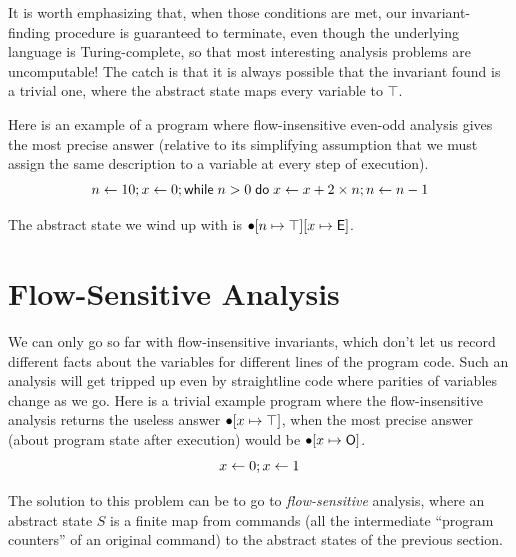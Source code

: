 \documentclass{amsbook}
\theoremstyle{definition}
\theoremstyle{remark}
\numberwithin{section}{chapter}
\numberwithin{equation}{chapter}
\begin{document}
It is worth emphasizing that, when those conditions are met, our invariant-finding procedure is guaranteed to terminate, even though the underlying language is Turing-complete, so that most interesting analysis problems are uncomputable!
The catch is that it is always possible that the invariant found is a trivial one, where the abstract state maps every variable to $\top$.

Here is an example of a program where flow-insensitive even-odd analysis gives the most precise answer (relative to its simplifying assumption that we must assign the same description to a variable at every step of execution).
$$n \leftarrow 10; x \leftarrow 0; \mathsf{while} \; n > 0 \; \mathsf{do} \; x \leftarrow x + 2 \times n; n \leftarrow n - 1$$

The abstract state we wind up with is $\bullet[n \mapsto \top][x \mapsto \mathsf{E}]$.

\section{Flow-Sensitive Analysis}

We can only go so far with flow-insensitive invariants, which don't let us record different facts about the variables for different lines of the program code.
Such an analysis will get tripped up even by straightline code where parities of variables change as we go.
Here is a trivial example program where the flow-insensitive analysis returns the useless answer $\bullet[x \mapsto \top]$, when the most precise answer (about program state after execution) would be $\bullet[x \mapsto \mathsf{O}]$.
$$x \leftarrow 0; x \leftarrow 1$$

The solution to this problem can be to go to \emph{flow-sensitive} analysis, where an abstract state $S$ is a finite map from commands (all the intermediate ``program counters'' of an original command) to the abstract states of the previous section.

\newcommand{\absstep}[3]{\mathcal S(#1, #2, #3)}
\newcommand{\absstepo}[2]{\mathcal S(#1, #2)}
\end{document}
